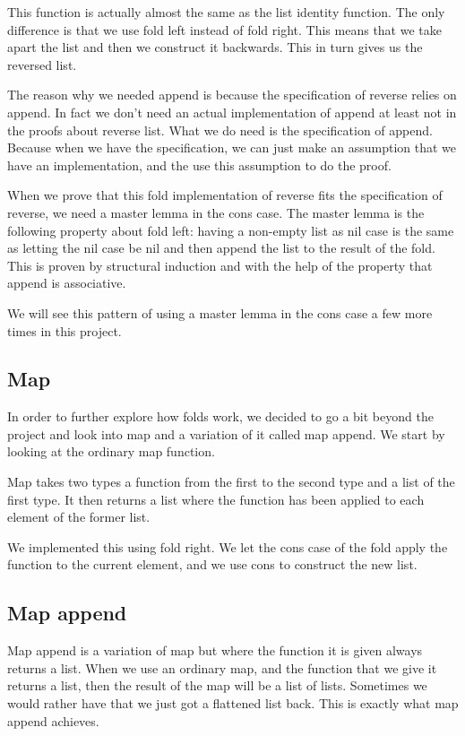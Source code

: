 \documentclass[a4paper]{article}
\begin{document}
This function is actually almost the same as the list identity function. The
only difference is that we use fold left instead of fold right. This means that
we take apart the list and then we construct it backwards. This in turn gives us
the reversed list.

The reason why we needed append is because the specification of reverse relies
on append. In fact we don't need an actual implementation of append at least not
in the proofs about reverse list. What we do need is the specification of
append. Because when we have the specification, we can just make an assumption
that we have an implementation, and the use this assumption to do the proof.

When we prove that this fold implementation of reverse fits the specification of
reverse, we need a master lemma in the cons case. The master lemma is the
following property about fold left: having a non-empty list as nil case is the
same as letting the nil case be nil and then append the list to the result of
the fold. This is proven by structural induction and with the help of the
property that append is associative.

We will see this pattern of using a master lemma in the cons case a few more
times in this project.

\subsection{Map}
In order to further explore how folds work, we decided to go a bit beyond the
project and look into map and a variation of it called map append. We start by
looking at the ordinary map function.

Map takes two types a function from the first to the second type and a list of
the first type.  It then returns a list where the function has been applied to
each element of the former list.

We implemented this using fold right. We let the cons case of the fold apply the
function to the current element, and we use cons to construct the new list.

\subsection{Map append}
Map append is a variation of map but where the function it is given always
returns a list. When we use an ordinary map, and the function that we give it
returns a list, then the result of the map will be a list of lists. Sometimes we
would rather have that we just got a flattened list back. This is exactly what
map append achieves.
\end{document}
